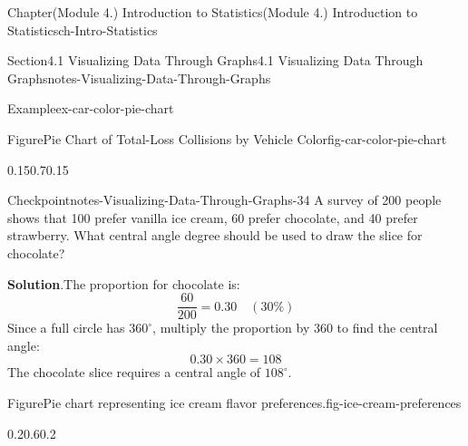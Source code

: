 \documentclass[oneside,10pt,]{book}
\newcommand{\blocktitlefont}{\relax}
\begin{document}
\begin{chapterptx}{Chapter}{(Module 4.) Introduction to Statistics}{}{(Module 4.) Introduction to Statistics}{}{}{ch-Intro-Statistics}
\begin{sectionptx}{Section}{4.1 Visualizing Data Through Graphs}{}{4.1 Visualizing Data Through Graphs}{}{}{notes-Visualizing-Data-Through-Graphs}
\begin{example}{Example}{}{ex-car-color-pie-chart}
\begin{figureptx}{Figure}{Pie Chart of Total-Loss Collisions by Vehicle Color}{fig-car-color-pie-chart}{}
\begin{image}{0.15}{0.7}{0.15}{}
{%
}%
\end{image}%
\tcblower
\end{figureptx}%
\end{example}
\begin{inlineexercise}{Checkpoint}{}{notes-Visualizing-Data-Through-Graphs-34}%
A survey of 200 people shows that 100 prefer vanilla ice cream, 60 prefer chocolate, and 40 prefer strawberry. What central angle degree should be used to draw the slice for chocolate?%
\par\smallskip%
\noindent\textbf{\blocktitlefont Solution}.\hypertarget{notes-Visualizing-Data-Through-Graphs-34-2}{}\quad{}The proportion for chocolate is:%
\begin{equation*}
\frac{60}{200} = 0.30 \quad (30\%)
\end{equation*}
Since a full circle has \(360^\circ\), multiply the proportion by 360 to find the central angle:%
\begin{equation*}
0.30 \times 360 = 108
\end{equation*}
The chocolate slice requires a central angle of \(108^\circ\).%
\begin{figureptx}{Figure}{Pie chart representing ice cream flavor preferences.}{fig-ice-cream-preferences}{}%
\begin{image}{0.2}{0.6}{0.2}{}%
\end{image}
\end{figureptx}
\end{inlineexercise}
\end{sectionptx}
\end{chapterptx}
\end{document}
